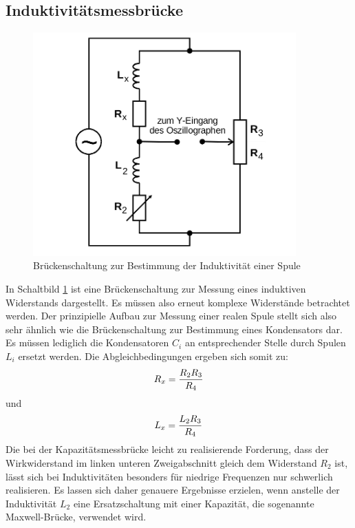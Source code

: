 \subsection{Induktivitätsmessbrücke}

\begin{figure}
  \centering
  \includegraphics[width=0.9\textwidth]{Bilder/Messbruecke_Spule_mit_R.png}
  \caption{Brückenschaltung zur Bestimmung der Induktivität einer Spule  \cite{Anleitung}}
  \label{fig:induktivitätsmessbrücke}
\end{figure}
In Schaltbild \ref{fig:induktivitätsmessbrücke} ist eine Brückenschaltung zur Messung eines induktiven Widerstands dargestellt.
Es müssen also erneut komplexe Widerstände betrachtet werden. Der prinzipielle Aufbau zur Messung einer realen Spule stellt sich also sehr ähnlich wie die Brückenschaltung zur Bestimmung eines Kondensators dar.
Es müssen lediglich die Kondensatoren $C_i$ an entsprechender Stelle durch Spulen $L_i$ ersetzt werden.
Die Abgleichbedingungen ergeben sich somit zu:
\begin{equation}
\centering
\label{eqn:indukwiderstand}
R_x=\frac{R_2R_3}{R_4}
\end{equation}
und
\begin{equation}
\centering
\label{eqn:induktivität}
L_x=\frac{L_2R_3}{R_4}
\end{equation}
Die bei der Kapazitätsmessbrücke leicht zu realisierende Forderung, dass der Wirkwiderstand im linken unteren Zweigabschnitt gleich dem Widerstand $R_2$ ist,
lässt sich bei Induktivitäten besonders für niedrige Frequenzen nur schwerlich realisieren.
Es lassen sich daher genauere Ergebnisse erzielen, wenn anstelle der Induktivität $L_2$ eine Ersatzschaltung mit einer Kapazität, die sogenannte Maxwell-Brücke, verwendet wird.


